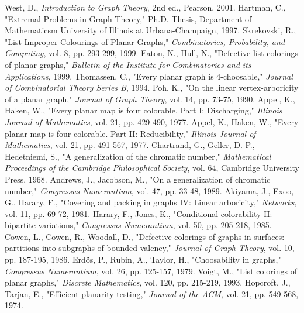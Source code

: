 \documentclass[letterpaper, 12pt]{amsart}
\theoremstyle{definition}
\theoremstyle{definition}
\theoremstyle{thm}
\theoremstyle{definition}
\begin{document}
\begin{thebibliography}{21}  %
	West, D., \textit{Introduction to Graph Theory},
	2nd ed., Pearson, 2001.
	Hartman, C.,
	"Extremal Problems in Graph Theory," Ph.D. Thesis, Department of
	Mathematicsm University of Illinois at Urbana-Champaign, 1997.
	Skrekovski, R., "List Improper Colourings of Planar Graphs,"
	\textit{Combinatorics, Probability, and Computing}, vol. 8, pp. 293-299,
	1999.
	Eaton, N., Hull, N., "Defective list colorings of planar graphs,"
	\emph{Bulletin of the Institute for Combinatorics and its Applications},
	1999.
	Thomassen, C., "Every planar graph is 4-choosable,"
	\emph{Journal of Combinatorial Theory Series B}, 1994.
	Poh, K., "On the linear vertex-arboricity of a planar graph,"
	\emph{Journal of Graph Theory}, vol. 14, pp. 73-75, 1990.
	Appel, K., Haken, W., "Every planar map is four colorable. Part I:
	Discharging," \textit{Illinois Journal of Mathematics}, vol. 21, pp. 429-490,
	1977.
	Appel, K., Haken, W., "Every planar map is four colorable. Part II:
	Reducibility," \textit{Illinois Journal of Mathematics}, vol. 21, pp.
	491-567, 1977.
	Chartrand, G., Geller, D. P., Hedetniemi, S., "A generalization of the
	chromatic number," \textit{Mathematical Proceedings of the Cambridge
	Philosophical Society}, vol. 64, Cambridge University Press, 1968.
	Andrews, J., Jacobson, M., "On a generalization of chromatic number,"
	\textit{Congressus Numerantium}, vol. 47, pp. 33-48, 1989.
	Akiyama, J., Exoo, G., Harary, F., "Covering and packing in graphs IV: Linear arboricity,"
	\textit{Networks}, vol. 11, pp. 69-72, 1981.
	Harary, F., Jones, K., "Conditional colorability II: bipartite variations,"
	\textit{Congressus Numerantium}, vol. 50, pp. 205-218, 1985.
	Cowen, L., Cowen, R., Woodall, D., "Defective colorings of graphs in
	surfaces: partitions into subgraphs of bounded valency,"
	\textit{Journal of Graph Theory}, vol. 10, pp. 187-195, 1986.
	Erd{\"o}s, P., Rubin, A., Taylor, H., "Choosability in graphs,"
	\textit{Congressus Numerantium}, vol. 26, pp. 125-157, 1979.
	Voigt, M., "List colorings of planar graphs,"
	\textit{Discrete Mathematics}, vol. 120, pp. 215-219, 1993.
	Hopcroft, J., Tarjan, E., "Efficient planarity testing," \textit{Journal of
	the ACM}, vol. 21, pp. 549-568, 1974.

\end{thebibliography}
\end{document}
